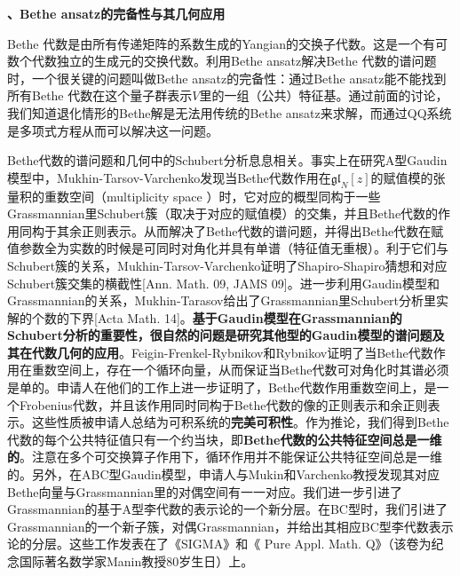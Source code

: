 \documentclass[12pt,UTF8,AutoFakeBold=4,a4paper]{ctexart}
\begin{document}

\medskip

\textbf{、Bethe ansatz的完备性与其几何应用}

Bethe 代数是由所有传递矩阵的系数生成的Yangian的交换子代数。这是一个有可数个代数独立的生成元的交换代数。利用Bethe ansatz解决Bethe 代数的谱问题时，一个很关键的问题叫做Bethe ansatz的完备性：通过Bethe ansatz能不能找到所有Bethe 代数在这个量子群表示$V$里的一组（公共）特征基。通过前面的讨论，我们知道退化情形的Bethe解是无法用传统的Bethe ansatz来求解，而通过QQ系统是多项式方程从而可以解决这一问题。

Bethe代数的谱问题和几何中的Schubert分析息息相关。事实上在研究A型Gaudin模型中，Mukhin-Tarsov-Varchenko发现当Bethe代数作用在$\mathfrak{gl}_N[z]$的赋值模的张量积的重数空间（multiplicity space ）时，它对应的概型同构于一些Grassmannian里Schubert簇（取决于对应的赋值模）的交集，并且Bethe代数的作用同构于其余正则表示。从而解决了Bethe代数的谱问题，并得出Bethe代数在赋值参数全为实数的时候是可同时对角化并具有单谱（特征值无重根）。利于它们与Schubert簇的关系，Mukhin-Tarsov-Varchenko证明了Shapiro-Shapiro猜想和对应Schubert簇交集的横截性[Ann. Math. 09, JAMS 09]。进一步利用Gaudin模型和Grassmannian的关系，Mukhin-Tarasov给出了Grassmannian里Schubert分析里实解的个数的下界[Acta Math. 14]。\textbf{基于Gaudin模型在Grassmannian的Schubert分析的重要性，很自然的问题是研究其他型的Gaudin模型的谱问题及其在代数几何的应用}。Feigin-Frenkel-Rybnikov和Rybnikov证明了当Bethe代数作用在重数空间上，存在一个循环向量，从而保证当Bethe代数可对角化时其谱必须是单的。申请人在他们的工作上进一步证明了，Bethe代数作用重数空间上，是一个Frobenius代数，并且该作用同时同构于Bethe代数的像的正则表示和余正则表示。这些性质被申请人总结为可积系统的\textbf{完美可积性}。作为推论，我们得到Bethe代数的每个公共特征值只有一个约当块，即\textbf{Bethe代数的公共特征空间总是一维的}。注意在多个可交换算子作用下，循环作用并不能保证公共特征空间总是一维的。另外，在ABC型Gaudin模型，申请人与Mukin和Varchenko教授发现其对应Bethe向量与Grassmannian里的对偶空间有一一对应。我们进一步引进了Grassmannian的基于A型李代数的表示论的一个新分层。在BC型时，我们引进了Grassmannian的一个新子簇，对偶Grassmannian，并给出其相应BC型李代数表示论的分层。这些工作发表在了《SIGMA》和《 Pure Appl. Math. Q》（该卷为纪念国际著名数学家Manin教授80岁生日）上。
\end{document}
